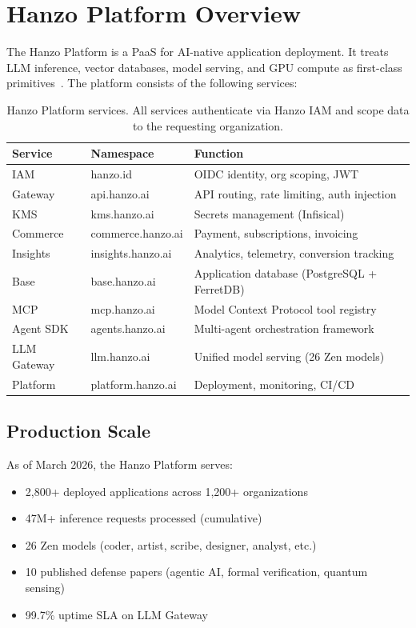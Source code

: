 \section{Hanzo Platform Overview}

\label{sec:platform}

The Hanzo Platform is a PaaS for AI-native application deployment. It treats LLM
inference, vector databases, model serving, and GPU compute as first-class
primitives~\cite{hanzoplatform}. The platform consists of the following services:

\begin{table}[H]
\centering
\small
\begin{tabular}{llp{5.5cm}}
\toprule
\textbf{Service} & \textbf{Namespace} & \textbf{Function} \\
\midrule
IAM & hanzo.id & OIDC identity, org scoping, JWT \\
Gateway & api.hanzo.ai & API routing, rate limiting, auth injection \\
KMS & kms.hanzo.ai & Secrets management (Infisical) \\
Commerce & commerce.hanzo.ai & Payment, subscriptions, invoicing \\
Insights & insights.hanzo.ai & Analytics, telemetry, conversion tracking \\
Base & base.hanzo.ai & Application database (PostgreSQL + FerretDB) \\
MCP & mcp.hanzo.ai & Model Context Protocol tool registry \\
Agent SDK & agents.hanzo.ai & Multi-agent orchestration framework \\
LLM Gateway & llm.hanzo.ai & Unified model serving (26 Zen models) \\
Platform & platform.hanzo.ai & Deployment, monitoring, CI/CD \\
\bottomrule
\end{tabular}
\caption{Hanzo Platform services. All services authenticate via Hanzo IAM and scope data to the requesting organization.}
\label{tab:services}
\end{table}

\subsection{Production Scale}

As of March 2026, the Hanzo Platform serves:

\begin{itemize}[leftmargin=1.1em]
    \item 2,800+ deployed applications across 1,200+ organizations
    \item 47M+ inference requests processed (cumulative)
    \item 26 Zen models (coder, artist, scribe, designer, analyst, etc.)
    \item 10 published defense papers (agentic AI, formal verification, quantum sensing)
    \item 99.7\% uptime SLA on LLM Gateway
\end{itemize}


